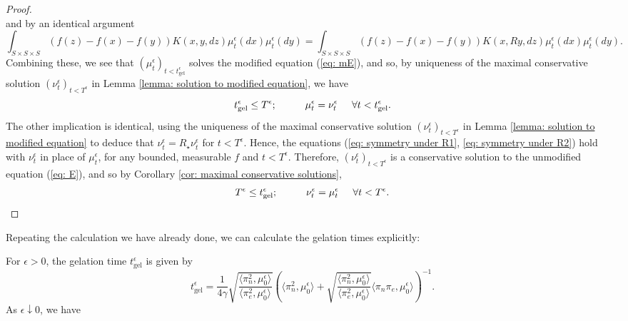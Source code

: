 \begin{proof}
\begin{equation}
    \end{equation} and by an identical argument \begin{equation}\label{eq: symmetry under R2}
        \int_{S\times S\times S} (f(z)-f(x)-f(y))K(x,y,dz)\mu^\epsilon_t(dx)\mu^\epsilon_t(dy) =  \int_{S\times S\times S} (f(z)-f(x)-f(y))K(x,Ry,dz)\mu^\epsilon_t(dx)\mu^\epsilon_t(dy).
    \end{equation} Combining these, we see that $(\mu^\epsilon_t)_{t<t^\epsilon_\text{gel}}$ solves the modified equation (\ref{eq: mE}), and so, by uniqueness of the maximal conservative solution $(\nu^\epsilon_t)_{t<T^\epsilon}$ in Lemma \ref{lemma: solution to modified equation}, we have \begin{equation}
        t^\epsilon_\text{gel} \leq T^\epsilon; \hspace{1cm} \mu^\epsilon_t=\nu^\epsilon_t \hspace{0.5cm}\forall t<t^\epsilon_\text{gel}.
    \end{equation} The other implication is identical, using the uniqueness of the maximal conservative solution $(\nu^\epsilon_t)_{t<T^\epsilon}$ in Lemma \ref{lemma: solution to modified equation} to deduce that $\nu^\epsilon_t=R_\star \nu^\epsilon_t$ for $t<T^\epsilon$. Hence, the equations (\ref{eq: symmetry under R1}, \ref{eq: symmetry under R2}) hold with $\nu^\epsilon_t$ in place of $\mu^\epsilon_t$, for any bounded, measurable $f$ and $t<T^\epsilon.$ Therefore, $(\nu^\epsilon_t)_{t<T^\epsilon}$ is a conservative solution to the unmodified equation (\ref{eq: E}), and so by Corollary \ref{cor: maximal conservative solutions}, \begin{equation}
        T^\epsilon \leq t^\epsilon_\text{gel}; \hspace{1cm} \nu^\epsilon_t=\mu^\epsilon_t \hspace{0.5cm}\forall t<T^\epsilon.
    \end{equation} \end{proof}  \iffalse Repeating the calculation we have already done, we can calculate the gelation times explicitly: \begin{lemma}\label{lemma: calculation of gelation} For $\epsilon>0$, the gelation time $t_\text{gel}^\epsilon$ is given by \begin{equation} t_\text{gel}^\epsilon = \frac{1}{4\gamma}\sqrt{\frac{\langle \pi_n^2, \mu_0^\epsilon\rangle}{\langle \pi_e^2, \mu_0^\epsilon\rangle}}\left(\langle \pi_n^2, \mu_0^\epsilon\rangle+\sqrt{\frac{\langle \pi_n^2, \mu_0^\epsilon\rangle}{\langle \pi_e^2, \mu_0^\epsilon\rangle}}\langle \pi_n\pi_e, \mu_0^\epsilon\rangle \right)^{-1}. \end{equation} As $\epsilon \downarrow 0$, we have \begin{equation}

\end{equation}
\end{lemma}
